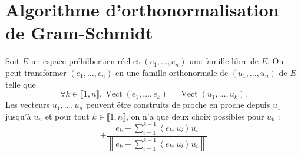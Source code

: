 \documentclass[../main.tex]{subfiles}
\begin{document}
\section{Algorithme d'orthonormalisation de Gram-Schmidt}
\begin{tcolorbox}[title=Théorème 34.28, title filled=false, colframe=orange, colback=orange!10!white]
    Soit $E$ un espace préhilbertien réel et $\left(e_1, \ldots, e_n\right)$ une famille libre de $E$. On peut transformer $\left(e_1, \ldots, e_n\right)$ en une famille orthonormale de $\left(u_1, \ldots, u_n\right)$ de $E$ telle que
    $$\forall k \in \llbracket 1, n \rrbracket, \operatorname{Vect}\left(e_1, \ldots, e_k\right)=\operatorname{Vect}\left(u_1, \ldots, u_k\right) .$$
    Les vecteurs $u_1, \ldots, u_n$ peuvent être construits de proche en proche depuis $u_1$ jusqu'à $u_n$ et pour tout $k \in \llbracket 1, n \rrbracket$, on n'a que deux choix possibles pour $u_k$ :
    $$\pm \frac{e_k-\sum\limits_{i=1}^{k-1}\left\langle e_k, u_i\right\rangle u_i}{\left\|e_k-\sum\limits_{i=1}^{k-1}\left\langle e_k, u_i\right\rangle u_i\right\|}$$
\end{tcolorbox}
\end{document}
